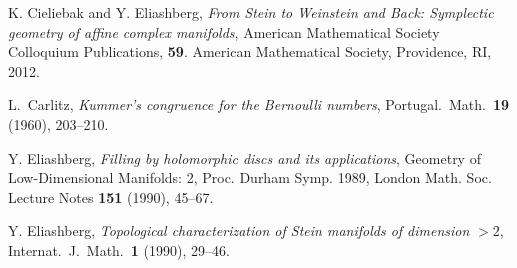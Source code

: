 \documentclass[12pt]{amsart}
\theoremstyle{remark}
\begin{document}
\begin{thebibliography}{999}



 K. Cieliebak and Y. Eliashberg,
{\em {F}rom Stein to Weinstein and Back: Symplectic geometry of affine complex manifolds},
American Mathematical Society Colloquium Publications, {\bf59}. American
Mathematical Society, Providence, RI, 2012.


 L.~Carlitz, {\em Kummer's congruence for the Bernoulli numbers},
Portugal.~Math.~\textbf{19} (1960), 203--210.





 Y. Eliashberg, {\em Filling by holomorphic
  discs and its applications}, Geometry of Low-Dimensional
  Manifolds: 2, Proc. Durham Symp. 1989, London Math. Soc. Lecture
  Notes \textbf{151} (1990), 45--67.

 Y. Eliashberg, {\em Topological characterization of Stein manifolds of dimension} $>2$, Internat.~J.~Math.~\textbf{1} (1990), 29--46.


\end{thebibliography}
\end{document}
